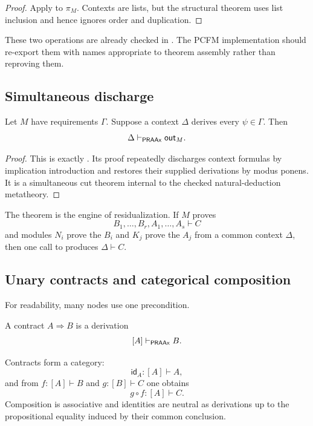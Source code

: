 \begin{proof}
Apply  to \(\pi_M\).  Contexts are lists, but the structural
theorem uses list inclusion and hence ignores order and duplication.
\end{proof}

These two operations are already checked in .  The
PCFM implementation should re-export them with names appropriate to theorem
assembly rather than reproving them.

\subsection{Simultaneous discharge}

\begin{theorem}
Let \(M\) have requirements \(\Gamma\).  Suppose a context \(\Delta\) derives
every \(\psi\in\Gamma\).  Then
\[
   \Delta\vdash_{\mathsf{PRAAx}}\mathsf{out}_M.
\]
\end{theorem}

\begin{proof}
This is exactly .  Its proof repeatedly discharges context
formulas by implication introduction and restores their supplied derivations by
modus ponens.  It is a simultaneous cut theorem internal to the checked
natural-deduction metatheory.
\end{proof}

The theorem is the engine of residualization.  If \(M\) proves
\[
  B_1,\ldots,B_r,A_1,\ldots,A_s\vdash C
\]
and modules \(N_i\) prove the \(B_i\) and \(K_j\) prove the \(A_j\) from a
common context \(\Delta\), then one call to  produces
\(\Delta\vdash C\).

\subsection{Unary contracts and categorical composition}

For readability, many nodes use one precondition.

\begin{definition}[Contract]
A contract \(A\Rightarrow B\) is a derivation
\[
       [A]\vdash_{\mathsf{PRAAx}}B.
\]
\end{definition}

\begin{theorem}
Contracts form a category:
\[
  \mathsf{id}_A:[A]\vdash A,
\]
and from \(f:[A]\vdash B\) and \(g:[B]\vdash C\) one obtains
\[
  g\circ f:[A]\vdash C.
\]
Composition is associative and identities are neutral as derivations up to the
propositional equality induced by their common conclusion.
\end{theorem}

